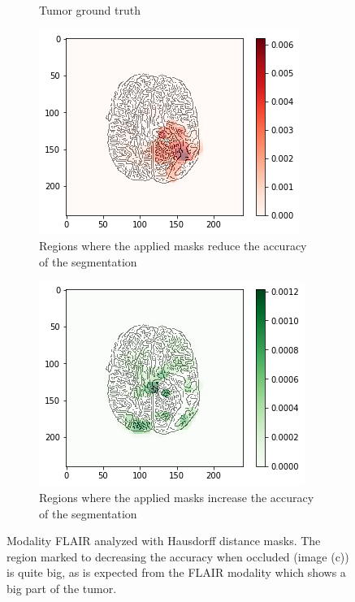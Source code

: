 \begin{figure}[H]
\begin{subfigure}[t]{.4\textwidth}
        \caption{Tumor ground truth}
    \end{subfigure}
    \begin{subfigure}[t]{.45\textwidth}
        \centering
        \includegraphics[width=\linewidth]{chapters/06_hdm/b_Brats18_TCIA08_242_1_L2/38.png}
        \caption{Regions where the applied masks reduce the accuracy of the segmentation}
    \end{subfigure}\hspace{1cm}%
    \begin{subfigure}[t]{.45\textwidth}
        \centering
        \includegraphics[width=\linewidth]{chapters/06_hdm/b_Brats18_TCIA08_242_1_L2/39.png}
        \caption{Regions where the applied masks increase the accuracy of the segmentation}
    \end{subfigure}
    \caption{Modality FLAIR analyzed with Hausdorff distance masks. The region marked to decreasing the accuracy when occluded (image (c)) is quite big, as is expected from the FLAIR modality which shows a big part of the tumor.}
    \label{brats_tcia08_flair}
\end{figure}


